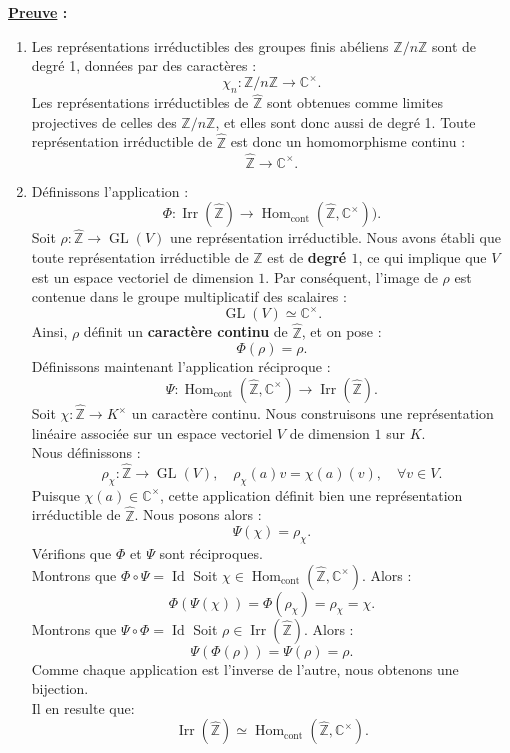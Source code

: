 \documentclass[a4paper, 14pt]{report}
\begin{document}
\begin{onehalfspace}
{			
			\textbf{\underline{Preuve} :}
			\begin{enumerate} [label=\roman*)] 
				\item 
				Les représentations irréductibles des groupes finis abéliens $\mathbb{Z}/n\mathbb{Z}$ sont de degré 1, données par des caractères :
				\[
				\chi_n : \mathbb{Z}/n\mathbb{Z} \to \mathbb{C}^\times .
				\]
				Les représentations irréductibles de $\widehat{\mathbb{Z}}$ sont obtenues comme limites projectives de celles des $\mathbb{Z}/n\mathbb{Z}$, et elles sont donc aussi de degré 1. Toute représentation irréductible de $\widehat{\mathbb{Z}}$ est donc un homomorphisme continu :
				\[
				\widehat{\mathbb{Z}} \to \mathbb{C}^\times.
				\]
				\item Définissons l'application :
				\[
				\Phi : \operatorname{Irr}(\widehat{\mathbb{Z}}) \to \operatorname{Hom}_{\text{cont}}(\widehat{\mathbb{Z}}, \mathbb{C}^\times)).
				\]
				Soit $\rho : \widehat{\mathbb{Z}} \to \operatorname{GL}(V)$ une représentation irréductible. Nous avons établi que toute représentation irréductible de $\widehat{\mathbb{Z}}$ est de \textbf{degré $1$}, ce qui implique que $V$ est un espace vectoriel de dimension $1$. Par conséquent, l'image de $\rho$ est contenue dans le groupe multiplicatif des scalaires :
				\[
				\operatorname{GL}(V) \simeq \mathbb{C}^\times.
				\]
				Ainsi, $\rho$ définit un \textbf{caractère continu} de $\widehat{\mathbb{Z}}$, et on pose :
				\[
				\Phi(\rho) = \rho.
				\]
				Définissons maintenant l'application réciproque :
				\[
				\Psi : \operatorname{Hom}_{\text{cont}}(\widehat{\mathbb{Z}}, \mathbb{C}^\times) \to \operatorname{Irr}(\widehat{\mathbb{Z}}).
				\]
				Soit $\chi : \widehat{\mathbb{Z}} \to K^\times$ un caractère continu. Nous construisons une représentation linéaire associée sur un espace vectoriel $V$ de dimension $1$ sur $K$. \\ 
				Nous définissons :
				\[
				\rho_\chi : \widehat{\mathbb{Z}} \to \operatorname{GL}(V), \quad \rho_\chi(a) v = \chi(a)(v), \quad \forall v \in V.
				\]
				Puisque $\chi(a) \in \mathbb{C}^\times$, cette application définit bien une représentation irréductible de $\widehat{\mathbb{Z}}$. Nous posons alors :
				\[
				\Psi(\chi) = \rho_\chi.
				\]
				Vérifions que $\Phi$ et $\Psi$ sont réciproques.\\	
				Montrons que $\Phi \circ \Psi = \operatorname{Id}$  
				Soit $\chi \in \operatorname{Hom}_{\text{cont}}(\widehat{\mathbb{Z}}, \mathbb{C}^\times)$. Alors :
				\[
				\Phi(\Psi(\chi)) = \Phi(\rho_\chi) = \rho_\chi = \chi.
				\]
				Montrons que $\Psi \circ \Phi = \operatorname{Id}$ 
				Soit $\rho \in \operatorname{Irr}(\widehat{\mathbb{Z}})$. Alors :
				\[
				\Psi(\Phi(\rho)) = \Psi(\rho) = \rho.
				\]
				Comme chaque application est l'inverse de l'autre, nous obtenons une bijection.\\	
				Il en resulte que:
				\[ 
				\operatorname{Irr}(\widehat{\mathbb{Z}}) \simeq \operatorname{Hom}_{\text{cont}}(\widehat{\mathbb{Z}}, \mathbb{C}^\times).
				\]
				

\end{enumerate}}
\end{onehalfspace}
\end{document}
